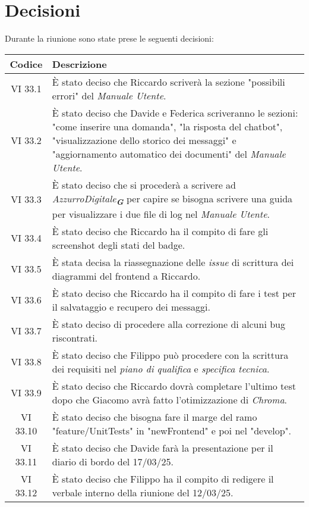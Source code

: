 
\section{Decisioni}

Durante la riunione sono state prese le seguenti decisioni:

\vspace{0.5cm}

\begin{table}[htbp]
    \centering
    \begin{tabular}{|c|p{}|}
        \hline
        \rowcolor[gray]{0.75}
        \textbf{Codice} & \textbf{Descrizione}\\
        \hline
        VI 33.1 & È stato deciso che Riccardo scriverà la sezione "possibili errori" del \emph{Manuale Utente}.\\
        \hline
        VI 33.2 & È stato deciso che Davide e Federica scriveranno le sezioni: "come inserire una domanda", "la risposta del chatbot", "visualizzazione dello storico dei messaggi" e "aggiornamento automatico dei documenti" del \emph{Manuale Utente}.\\
        \hline
        VI 33.3 & È stato deciso che si procederà a scrivere ad \emph{AzzurroDigitale}\textsubscript{\textit{\textbf{G}}} per capire se bisogna scrivere una guida per visualizzare i due file di log nel \emph{Manuale Utente}.\\
        \hline 
        VI 33.4 & È stato deciso che Riccardo ha il compito di fare gli screenshot degli stati del badge.\\
        \hline
        VI 33.5 & È stata decisa la riassegnazione delle \emph{issue} di scrittura dei diagrammi del frontend a Riccardo.\\
        \hline
        VI 33.6 & È stato deciso che Riccardo ha il compito di fare i test per il salvataggio e recupero dei messaggi.\\
        \hline
        VI 33.7 & È stato deciso di procedere alla correzione di alcuni bug riscontrati.\\
        \hline
        VI 33.8 & È stato deciso che Filippo può procedere con la scrittura dei requisiti nel \emph{piano di qualifica} e \emph{specifica tecnica}.\\
        \hline
        VI 33.9 & È stato deciso che Riccardo dovrà completare l'ultimo test dopo che Giacomo avrà fatto l'otimizzazione di \emph{Chroma}. \\
        \hline
        VI 33.10 & È stato deciso che bisogna fare il marge del ramo "feature/UnitTests" in "newFrontend" e poi nel "develop".\\
        \hline
        VI 33.11 & È stato deciso che Davide farà la presentazione per il diario di bordo del 17/03/25.\\
        \hline
        VI 33.12 & È stato deciso che Filippo ha il compito di redigere il verbale interno della riunione del 12/03/25.\\
        \hline
    \end{tabular}
\end{table}